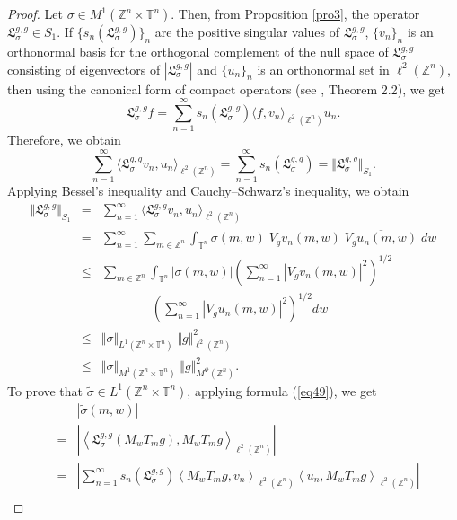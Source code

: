 \documentclass[a4paper,11pt, reqno]{amsart}
\theoremstyle{plain}
\theoremstyle{definition}
\theoremstyle{remark}
\def \Z{{\mathbb Z}}
\def \T{{\mathbb T}}
\begin{document}
\begin{proof}
Let $\sigma \in M^1(\Z^n \times \T^n)$. Then, from Proposition \ref{pro3}, the operator $\mathfrak{L}^{g, g}_{\sigma} \in S_1$. If $\{s_n(\mathfrak{L}^{g, g}_{\sigma}) \}_n$ are the positive singular values of $\mathfrak{L}^{g, g}_{\sigma}$, $\{ v_n \}_n$ is an orthonormal basis for the orthogonal complement of the null space of $\mathfrak{L}^{g, g}_{\sigma}$ consisting of eigenvectors of $|\mathfrak{L}^{g, g}_{\sigma}|$ and $\{ u_n \}_n$ is an orthonormal set in $\ell^2(\Z^n)$, then using the canonical form of compact operators (see \cite{won02}, Theorem 2.2), we get
\begin{equation}\label{eq49}
\mathfrak{L}^{g, g}_{\sigma}f =\sum_{n=1}^{\infty} s_n(\mathfrak{L}^{g, g}_{\sigma}) \langle f, v_n \rangle_{\ell^2(\Z^n)} u_n.
\end{equation}
Therefore, we obtain
\[ \sum_{n=1}^{\infty}  \langle \mathfrak{L}^{g, g}_{\sigma} v_n, u_n \rangle_{\ell^2(\Z^n)}   = \sum_{n=1}^{\infty} s_n(\mathfrak{L}^{g, g}_{\sigma})= \Vert \mathfrak{L}^{g, g}_{\sigma} \Vert_{S_1}.  \]
Applying Bessel's inequality and Cauchy--Schwarz's inequality, we obtain
\begin{eqnarray*}
\Vert \mathfrak{L}^{g, g}_{\sigma} \Vert_{S_1} 
& = &  \sum_{n=1}^{\infty}  \langle \mathfrak{L}^{g, g}_{\sigma} v_n, u_n \rangle_{\ell^2(\Z^n)} \\
& = & \sum_{n=1}^{\infty} \sum_{m \in \Z^n}  \int_{\T^n} \sigma(m, w) \; V_{g} v_n (m,w) \; \overline{V_{g} u_n (m,w)} \; dw \\
& \leq & \sum_{m \in \Z^n}  \int_{\T^n} |\sigma(m, w)| \left(\sum_{n=1}^{\infty} |V_{g} v_n (m,w)|^2 \right)^{1/2} \\ 
&& \qquad \qquad   \left(\sum_{n=1}^{\infty} |V_{g} u_n (m,w)|^2 \right)^{1/2} dw \\
& \leq & \Vert \sigma \Vert_{L^1(\Z^n \times \T^n)} \;\Vert g \Vert^2_{\ell^2(\Z^n)}  \\
& \leq & \Vert \sigma \Vert_{M^1(\Z^n \times \T^n)}\; \Vert g \Vert^2_{M^{\Phi}(\Z^n)}.
\end{eqnarray*}
To prove that $\tilde{\sigma} \in L^1(\Z^n \times \T^n)$, applying formula (\ref{eq49}), we get
\begin{eqnarray*}
&& |\tilde{\sigma}(m, w)| \\
& = & \left|\left\langle \mathfrak{L}^{g, g}_{\sigma}( M_w T_m g),  M_w T_m g \right\rangle_{\ell^2(\Z^n)}\right| \\
& = & \left| \sum_{n=1}^{\infty} s_n(\mathfrak{L}^{g, g}_{\sigma}) \left\langle  M_w T_m g, v_n \right\rangle_{\ell^2(\Z^n)} \left\langle u_n,  M_w T_m g \right\rangle_{\ell^2(\Z^n)} \right| \\

\end{eqnarray*}
\end{proof}
\end{document}
